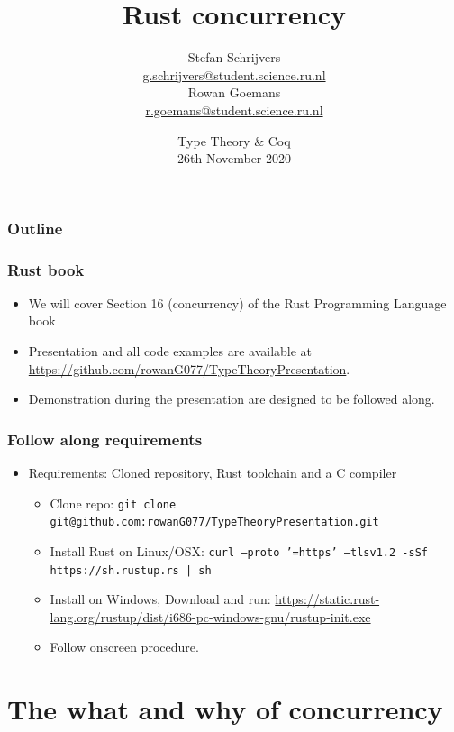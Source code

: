 \documentclass{beamer}
\title[Rust concurrency]{
  Rust concurrency}
\author[S. Schrijvers \& R. Goemans]{
  Stefan Schrijvers \\
  {\small \url{g.schrijvers@student.science.ru.nl}} \\
  \medskip
  Rowan Goemans \\
  {\small \url{r.goemans@student.science.ru.nl}} \\
  }
\institute[Radboud University Nijmegen]{
  Radboud University Nijmegen}
\date[Type Theory \& Coq 2020]{
  Type Theory \& Coq \\
  26th November 2020}
\begin{document}
\begin{frame}
  \titlepage
\end{frame}

\begin{frame}
  \frametitle{Outline}

  \tableofcontents
\end{frame}

\begin{frame}
  \frametitle{Rust book}

  \begin{itemize}
    \item We will cover Section 16 (concurrency) of the Rust Programming Language book \cite{rust-book}
    \item Presentation and all code examples are available at \url{https://github.com/rowanG077/TypeTheoryPresentation}.
    \item Demonstration during the presentation are designed to be followed along.
  \end{itemize}
\end{frame}

\begin{frame}
  \frametitle{Follow along requirements}
  \begin{itemize}
  \item Requirements: Cloned repository, Rust toolchain and a C compiler
    \begin{itemize}
        \item Clone repo: \texttt{git clone git@github.com:rowanG077/TypeTheoryPresentation.git}
        \item Install Rust on Linux/OSX: \texttt{curl --proto '=https' --tlsv1.2 -sSf https://sh.rustup.rs | sh}
        \item Install on Windows, Download and run: \url{https://static.rust-lang.org/rustup/dist/i686-pc-windows-gnu/rustup-init.exe}
        \item Follow onscreen procedure.
    \end{itemize}
  \end{itemize}
\end{frame}

\section{The what and why of concurrency}
\end{document}
